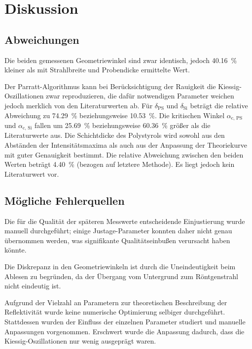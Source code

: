 \section{Diskussion}
\label{sec:diskussion}

\subsection{Abweichungen}
Die beiden gemessenen Geometriewinkel sind zwar identisch,
jedoch \SI{40.16}{\percent} kleiner als mit Strahlbreite und Probendicke ermittelte Wert.

Der Parratt-Algorithmus kann bei Berücksichtigung der Rauigkeit
die Kiessig-Oszillationen zwar reproduzieren,
die dafür notwendigen Parameter weichen jedoch merklich von den Literaturwerten ab.
Für $\delta_\text{PS}$ und $\delta_\text{Si}$ beträgt die relative Abweichung zu \cite{versuchsanleitung}
\SI{74.29}{\percent} beziehungsweise \SI{10.53}{\percent}.
Die kritischen Winkel $\alpha_\text{c, PS}$ und $\alpha_\text{c, Si}$
fallen um \SI{25.69}{\percent} beziehungsweise \SI{60.36}{\percent} größer als die Literaturwerte \cite{versuchsanleitung} aus.
Die Schichtdicke des Polystyrols wird
    sowohl aus den Abständen der Intensitätsmaxima
    als auch aus der Anpassung der Theoriekurve
mit guter Genauigkeit bestimmt.
Die relative Abweichung zwischen den beiden Werten beträgt \SI{4.40}{\percent}
    (bezogen auf letztere Methode).
Es liegt jedoch kein Literaturwert vor.


\subsection{Mögliche Fehlerquellen}
Die für die Qualität der späteren Messwerte entscheidende Einjustierung
wurde manuell durchgeführt;
einige Justage-Parameter konnten daher nicht genau übernommen werden,
was signifikante Qualitätseinbußen verursacht haben könnte.

Die Diskrepanz in den Geometriewinkeln ist durch die Uneindeutigkeit beim Ablesen zu begründen,
da der Übergang vom Untergrund zum Röntgenstrahl nicht eindeutig ist.

Aufgrund der Vielzahl an Parametern zur theoretischen Beschreibung der Reflektivität
wurde keine numerische Optimierung selbiger durchgeführt.
Stattdessen wurden der Einfluss der einzelnen Parameter studiert
und manuelle Anpassungen vorgenommen.
Erschwert wurde die Anpassung dadurch,
dass die Kiessig-Oszillationen nur wenig ausgeprägt waren.

